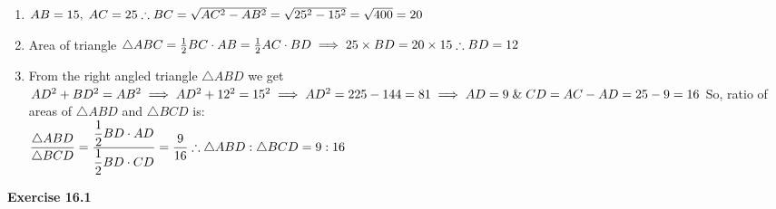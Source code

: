\begin{enumerate}
	\item $AB=15,\;AC=25\\ \therefore BC=\sqrt{AC^2-AB^2}=\sqrt{25^2-15^2}=\sqrt{400}=20$
	\item Area of triangle $\triangle ABC= \frac{1}{2}BC\cdot AB=\frac{1}{2}AC\cdot BD\\
	\implies 25\times BD=20\times 15\\ \therefore BD=12\\$
	\item From the right angled triangle $\triangle ABD$ we get\\
	$AD^2+BD^2=AB^2\\
	\implies AD^2+12^2=15^2\\
	\implies AD^2=225-144=81\\
	\implies AD=9\; \& \; CD=AC-AD=25-9=16\\$
	So, ratio of areas of $\triangle ABD$ and $\triangle BCD$ is:\\
	
	$\displaystyle \frac{\triangle ABD} {\triangle BCD}=\frac{\displaystyle\frac{1}{2}BD\cdot AD}{\displaystyle\frac{1}{2}BD\cdot CD}=\frac{9}{16}\\[1em]
	\therefore\triangle ABD : \triangle BCD=9 : 16\\[3ex]$ 
	
\end{enumerate}
\textbf{\Large Exercise 16.1\\[2ex]}
